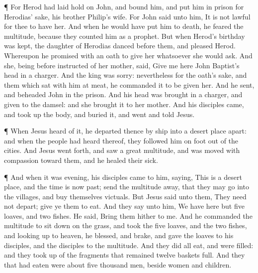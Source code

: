  ¶ For Herod had laid hold on John, and bound him, and put
him in prison for Herodias' sake, his brother Philip's wife.
 For John said unto him, It is not lawful for thee to have
her.  And when he would have put him to death, he feared the
multitude, because they counted him as a prophet.  But when
Herod's birthday was kept, the daughter of Herodias danced before them,
and pleased Herod.  Whereupon he promised with an oath to
give her whatsoever she would ask.  And she, being before
instructed of her mother, said, Give me here John Baptist's head in a
charger.  And the king was sorry: nevertheless for the
oath's sake, and them which sat with him at meat, he commanded it to be
given her.  And he sent, and beheaded John in the prison.
 And his head was brought in a charger, and given to the
damsel: and she brought it to her mother.  And his
disciples came, and took up the body, and buried it, and went and told
Jesus.

 ¶ When Jesus heard of it, he departed thence by ship into
a desert place apart: and when the people had heard thereof, they
followed him on foot out of the cities.  And Jesus went
forth, and saw a great multitude, and was moved with compassion toward
them, and he healed their sick.

 ¶ And when it was evening, his disciples came to him,
saying, This is a desert place, and the time is now past; send the
multitude away, that they may go into the villages, and buy themselves
victuals.  But Jesus said unto them, They need not depart;
give ye them to eat.  And they say unto him, We have here
but five loaves, and two fishes.  He said, Bring them
hither to me.  And he commanded the multitude to sit down
on the grass, and took the five loaves, and the two fishes, and looking
up to heaven, he blessed, and brake, and gave the loaves to his
disciples, and the disciples to the multitude.  And they
did all eat, and were filled: and they took up of the fragments that
remained twelve baskets full.  And they that had eaten were
about five thousand men, beside women and children.

